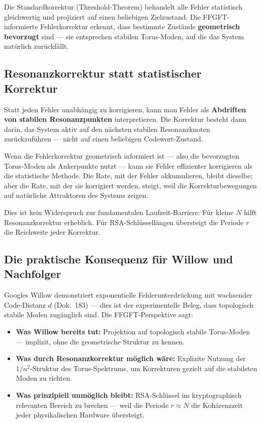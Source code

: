 Die Standardkorrektur (Threshold-Theorem) behandelt alle Fehler statistisch
gleichwertig und projiziert auf einen beliebigen Zielzustand. Die FFGFT-informierte
Fehlerkorrektur erkennt, dass bestimmte Zustände \textbf{geometrisch bevorzugt}
sind — sie entsprechen stabilen Torus-Moden, auf die das System natürlich
zurückfällt.

\subsection{Resonanzkorrektur statt statistischer Korrektur}

Statt jeden Fehler unabhängig zu korrigieren, kann man Fehler als
\textbf{Abdriften von stabilen Resonanzpunkten} interpretieren. Die Korrektur
besteht dann darin, das System aktiv auf den nächsten stabilen Resonanzknoten
zurückzuführen — nicht auf einen beliebigen Codewort-Zustand.

\begin{keyresult}
Wenn die Fehlerkorrektur geometrisch informiert ist — also die bevorzugten
Torus-Moden als Ankerpunkte nutzt — kann sie Fehler effizienter korrigieren als
die statistische Methode. Die Rate, mit der Fehler akkumulieren, bleibt dieselbe;
aber die Rate, mit der sie korrigiert werden, steigt, weil die Korrekturbewegungen
auf natürliche Attraktoren des Systems zeigen.

Dies ist kein Widerspruch zur fundamentalen Laufzeit-Barriere: Für kleine $N$
hilft Resonanzkorrektur erheblich. Für RSA-Schlüssellängen übersteigt die
Periode $r$ die Reichweite jeder Korrektur.
\end{keyresult}

\subsection{Die praktische Konsequenz für Willow und Nachfolger}

Googles Willow demonstriert exponentielle Fehlerunterdrückung mit wachsender
Code-Distanz $d$ (Dok.~183) — dies ist der experimentelle Beleg, dass topologisch
stabile Moden zugänglich sind. Die FFGFT-Perspektive sagt:

\begin{itemize}
    \item \textbf{Was Willow bereits tut:} Projektion auf topologisch stabile
    Torus-Moden — implizit, ohne die geometrische Struktur zu kennen.
    \item \textbf{Was durch Resonanzkorrektur möglich wäre:} Explizite Nutzung
    der $1/n^2$-Struktur des Torus-Spektrums, um Korrekturen gezielt auf die
    stabilsten Moden zu richten.
    \item \textbf{Was prinzipiell unmöglich bleibt:} RSA-Schlüssel im kryptographisch
    relevanten Bereich zu brechen — weil die Periode $r \approx N$ die Kohärenzzeit
    jeder physikalischen Hardware übersteigt.
\end{itemize}


